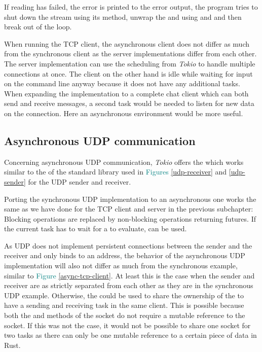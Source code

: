 If reading has failed, the error is printed to the error output, the program tries to shut down the stream using its
 method, unwrap the  and  using  and  and then break out
of the loop.

When running the TCP client, the asynchronous client does not differ as much from the synchronous client as the server
implementations differ from each other. The server implementation can use the scheduling from \textit{Tokio} to handle
multiple connections at once. The client on the other hand is idle while waiting for input on the command line anyway
because it does not have any additional tasks. When expanding the implementation to a complete chat client which can
both send and receive messages, a second task would be needed to listen for new data on the connection. Here an
asynchronous environment would be more useful.

\subsection{Asynchronous UDP communication}
Concerning asynchronous UDP communication, \textit{Tokio} offers the   which
works similar to the  of the standard library used in \textcolor{teal}{Figures \ref{udp-receiver}} and
\textcolor{teal}{\ref{udp-sender}} for the UDP sender and receiver.

Porting the synchronous UDP implementation to an asynchronous one works the same as we have done for the TCP client and
server in the previous subchapter: Blocking operations are replaced by non-blocking operations returning futures. If
the current task has to wait for a  to evaluate,  can be used.

As UDP does not implement persistent connections between the sender and the receiver and only binds to an address, the
behavior of the asynchronous UDP implementation will also not differ as much from the synchronous example, similar to
\textcolor{teal}{Figure \ref{async-tcp-client}}. At least this is the case when the sender and receiver are as strictly
separated from each other as they are in the synchronous UDP example. Otherwise, the 
 could be used to share the ownership of the  to have a sending and receiving task
in the same client. This is possible because both the  and  methods of the socket do not
require a mutable reference to the socket. If this was not the case, it would not be possible to share one socket for
two tasks as there can only be one mutable reference to a certain piece of data in Rust.
